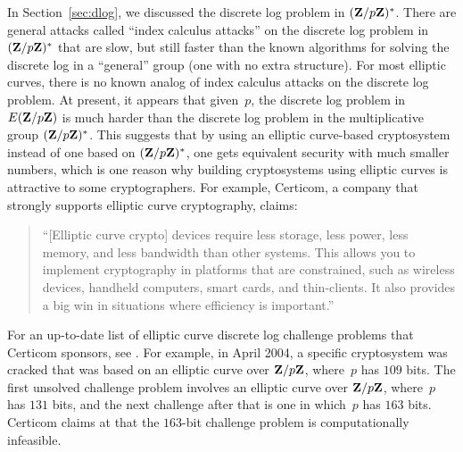 In Section~\ref{sec:dlog}, we discussed the discrete log problem in
$(\mathbf{Z}/p\mathbf{Z}{})^*$.  There are general attacks called ``index calculus
attacks'' on the discrete log problem in $(\mathbf{Z}/p\mathbf{Z}{})^*$ that are slow,
but still faster than the known algorithms for solving the discrete
log in a ``general'' group (one with no extra structure).  For most
elliptic curves, there is no known analog of index calculus attacks
on the discrete log problem.  At present, it appears that given~$p$,
the discrete log problem in $E(\mathbf{Z}/p\mathbf{Z}{})$ is much harder than the
discrete log problem in the multiplicative group $(\mathbf{Z}/p\mathbf{Z}{})^*$.  This
suggests that by using an elliptic curve-based cryptosystem instead of
one based on $(\mathbf{Z}/p\mathbf{Z}{})^*$, one gets equivalent security with much
smaller numbers, which is one reason why building cryptosystems using
elliptic curves is attractive to some cryptographers.  For example,
Certicom, a company that strongly supports elliptic curve
cryptography, claims:
\begin{quote}
``[Elliptic curve crypto] devices require less storage, less
power, less memory, and less bandwidth than other systems. This allows
you to implement cryptography in platforms that are constrained, such
as wireless devices, handheld computers, smart cards, and
thin-clients. It also provides a big win in situations where
efficiency is important.''
\end{quote}

For an up-to-date list of elliptic curve discrete log challenge
problems that Certicom sponsors, see \cite{certicom:challenge}.  For
example, in April 2004, a specific cryptosystem was cracked that was
based on an elliptic curve over $\mathbf{Z}/p\mathbf{Z}{}$, where~$p$ has $109$ bits.
The first unsolved challenge problem involves an elliptic curve over
$\mathbf{Z}/p\mathbf{Z}{}$, where~$p$ has $131$ bits, and the next challenge after
that is one in which~$p$ has $163$ bits.  Certicom claims at
\cite{certicom:challenge} that the $163$-bit challenge problem is
computationally infeasible.


